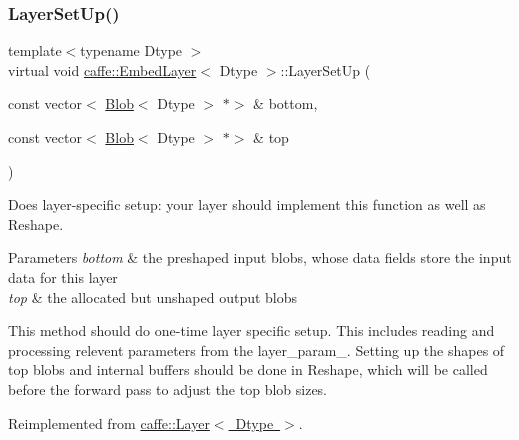 \subsubsection{\texorpdfstring{Layer\+Set\+Up()}{LayerSetUp()}\hspace{0.1cm}{\footnotesize\ttfamily [2/2]}}
{\footnotesize\ttfamily template$<$typename Dtype $>$ \\
virtual void \mbox{\hyperlink{classcaffe_1_1_embed_layer}{caffe\+::\+Embed\+Layer}}$<$ Dtype $>$\+::Layer\+Set\+Up (\begin{DoxyParamCaption}\item[{const vector$<$ \mbox{\hyperlink{classcaffe_1_1_blob}{Blob}}$<$ Dtype $>$ $\ast$$>$ \&}]{bottom,  }\item[{const vector$<$ \mbox{\hyperlink{classcaffe_1_1_blob}{Blob}}$<$ Dtype $>$ $\ast$$>$ \&}]{top }\end{DoxyParamCaption})\hspace{0.3cm}{\ttfamily [virtual]}}



Does layer-\/specific setup\+: your layer should implement this function as well as Reshape. 


\begin{DoxyParams}{Parameters}
{\em bottom} & the preshaped input blobs, whose data fields store the input data for this layer \\
\hline
{\em top} & the allocated but unshaped output blobs\\
\hline
\end{DoxyParams}
This method should do one-\/time layer specific setup. This includes reading and processing relevent parameters from the {\ttfamily layer\+\_\+param\+\_\+}. Setting up the shapes of top blobs and internal buffers should be done in {\ttfamily Reshape}, which will be called before the forward pass to adjust the top blob sizes. 

Reimplemented from \mbox{\hyperlink{classcaffe_1_1_layer_a481323a3e0972c682787f2137468c29f}{caffe\+::\+Layer$<$ Dtype $>$}}.

\mbox{\label{classcaffe_1_1_embed_layer_ac7c19a708d491f9fe161c78348ec794b}} 
